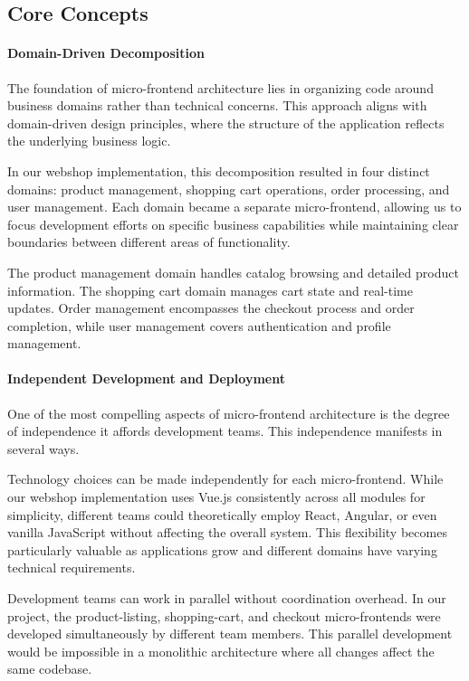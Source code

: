 \documentclass[12pt,a4paper]{report}
\begin{document}
\subsection*{Core Concepts}

\paragraph{Domain-Driven Decomposition}

The foundation of micro-frontend architecture lies in organizing code around business domains rather than technical concerns. This approach aligns with domain-driven design principles, where the structure of the application reflects the underlying business logic.

In our webshop implementation, this decomposition resulted in four distinct domains: product management, shopping cart operations, order processing, and user management. Each domain became a separate micro-frontend, allowing us to focus development efforts on specific business capabilities while maintaining clear boundaries between different areas of functionality.

The product management domain handles catalog browsing and detailed product information. The shopping cart domain manages cart state and real-time updates. Order management encompasses the checkout process and order completion, while user management covers authentication and profile management.

\paragraph{Independent Development and Deployment}

One of the most compelling aspects of micro-frontend architecture is the degree of independence it affords development teams. This independence manifests in several ways.

Technology choices can be made independently for each micro-frontend. While our webshop implementation uses Vue.js consistently across all modules for simplicity, different teams could theoretically employ React, Angular, or even vanilla JavaScript without affecting the overall system. This flexibility becomes particularly valuable as applications grow and different domains have varying technical requirements.

Development teams can work in parallel without coordination overhead. In our project, the product-listing, shopping-cart, and checkout micro-frontends were developed simultaneously by different team members. This parallel development would be impossible in a monolithic architecture where all changes affect the same codebase.
\end{document}
